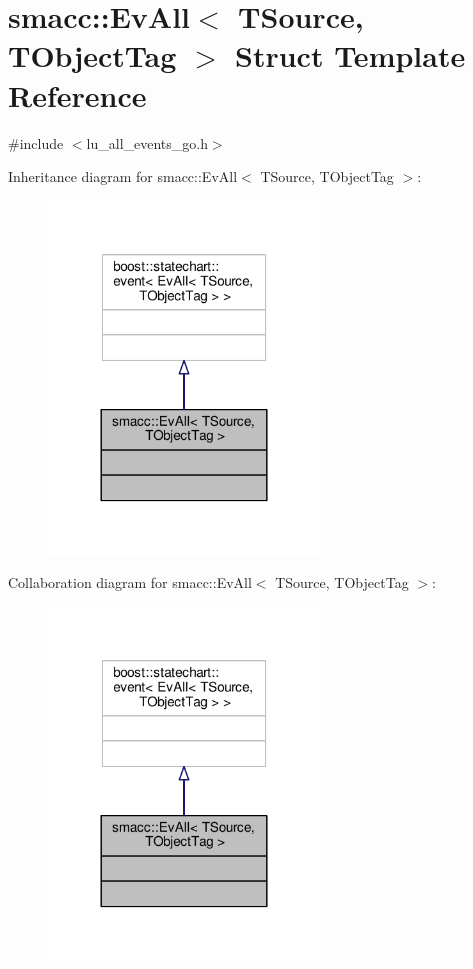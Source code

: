 \hypertarget{structsmacc_1_1EvAll}{}\section{smacc\+:\+:Ev\+All$<$ T\+Source, T\+Object\+Tag $>$ Struct Template Reference}
\label{structsmacc_1_1EvAll}


{\ttfamily \#include $<$lu\+\_\+all\+\_\+events\+\_\+go.\+h$>$}



Inheritance diagram for smacc\+:\+:Ev\+All$<$ T\+Source, T\+Object\+Tag $>$\+:
\nopagebreak
\begin{figure}[H]
\begin{center}
\leavevmode
\includegraphics[width=204pt]{structsmacc_1_1EvAll__inherit__graph}
\end{center}
\end{figure}


Collaboration diagram for smacc\+:\+:Ev\+All$<$ T\+Source, T\+Object\+Tag $>$\+:
\nopagebreak
\begin{figure}[H]
\begin{center}
\leavevmode
\includegraphics[width=204pt]{structsmacc_1_1EvAll__coll__graph}
\end{center}
\end{figure}



